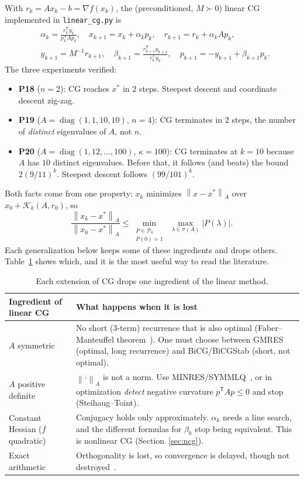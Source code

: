 \documentclass[11pt,a4paper]{article}
\theoremstyle{remark}
\newcommand{\K}{\mathcal{K}}
\newcommand{\norm}[1]{\left\lVert #1\right\rVert}
\newcommand{\ip}[2]{#1^{\mathsf T}#2}
\newcommand{\T}{^{\mathsf T}}
\begin{document}
With $r_k = Ax_k - b = \nabla f(x_k)$, the (preconditioned, $M\succ0$) linear CG implemented in \texttt{linear\_cg.py} is
\begin{equation}\label{eq:lcg}
\begin{aligned}
&\alpha_k = \frac{\ip{r_k}{y_k}}{\ip{p_k}{Ap_k}},\quad
x_{k+1}=x_k+\alpha_k p_k,\quad
r_{k+1}=r_k+\alpha_k Ap_k,\\
&y_{k+1}=M^{-1}r_{k+1},\quad
\beta_{k+1}=\frac{\ip{r_{k+1}}{y_{k+1}}}{\ip{r_k}{y_k}},\quad
p_{k+1}=-y_{k+1}+\beta_{k+1}p_k .
\end{aligned}
\end{equation}
The three experiments verified:
\begin{itemize}[leftmargin=1.5em]
\item \textbf{P18} ($n=2$): CG reaches $x^*$ in $2$ steps. Steepest descent and coordinate descent zig-zag.
\item \textbf{P19} ($A=\operatorname{diag}(1,1,10,10)$, $n=4$): CG terminates in $2$ steps, the number of \emph{distinct} eigenvalues of $A$, not $n$.
\item \textbf{P20} ($A=\operatorname{diag}(1,12,\dots,100)$, $\kappa=100$): CG terminates at $k=10$ because $A$ has $10$ distinct eigenvalues. Before that, it follows (and beats) the bound $2(9/11)^k$. Steepest descent follows $(99/101)^k$.
\end{itemize}
Both facts come from one property: $x_k$ minimizes $\norm{x-x^*}_A$ over $x_0+\K_k(A,r_0)$, so
\[
\frac{\norm{x_k-x^*}_A}{\norm{x_0-x^*}_A}\le \min_{\substack{P\in\mathcal P_k\\P(0)=1}}\ \max_{\lambda\in\sigma(A)}|P(\lambda)|.
\]
Each generalization below keeps some of these ingredients and drops others. Table~\ref{tab:ingredients} shows which, and it is the most useful way to read the literature.

\begin{table}[h]
\centering\small
\begin{tabularx}{\textwidth}{>{\raggedright\arraybackslash}p{4.2cm}X}
\toprule
Ingredient of linear CG & What happens when it is lost \\
\midrule
$A$ symmetric & No short (3-term) recurrence that is also optimal (Faber--Manteuffel theorem~\cite{FaberManteuffel1984}). One must choose between GMRES (optimal, long recurrence) and BiCG/BiCGStab (short, not optimal).\\
$A$ positive definite & $\norm{\cdot}_A$ is not a norm. Use MINRES/SYMMLQ~\cite{PaigeSaunders1975}, or in optimization \emph{detect} negative curvature $p\T Ap\le 0$ and stop (Steihaug--Toint).\\
Constant Hessian ($f$ quadratic) & Conjugacy holds only approximately. $\alpha_k$ needs a line search, and the different formulas for $\beta_k$ stop being equivalent. This is nonlinear CG (Section~\ref{sec:ncg}).\\
Exact arithmetic & Orthogonality is lost, so convergence is delayed, though not destroyed~\cite{MeurantStrakos2006,CarsonLiesenStrakos2024}.\\
\bottomrule
\end{tabularx}
\caption{Each extension of CG drops one ingredient of the linear method.}
\label{tab:ingredients}
\end{table}
\end{document}
